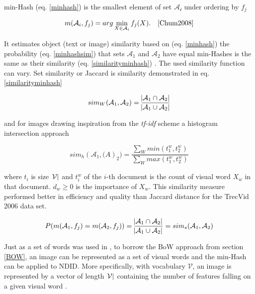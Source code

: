 \documentclass[english,12pt,a4paper,pdftex,elec,utf8, table]{aaltothesis}
\begin{document}
min-Hash (eq. \ref{minhash}) is the smallest element of set $\mathcal{A_i}$ under ordering by $f_j$

\begin{equation}\label{minhash}
m(\mathcal{A}_i,f_j)= arg \min_{X \in \mathcal{A}_i}f_j(X). \quad \cite{Chum2008}
\end{equation}

It estimates object (text or image) similarity based on (eq. \ref{minhash}) the probability (eq. \ref{minhashsim}) that sets $\mathcal{A}_1$ and $\mathcal{A}_2$ have equal min-Hashes is the same as their similarity (eq. \ref{similarityminhash}) \cite{Chum2008}. The used similarity function can vary. Set similarity or Jaccard is similarity demonstrated in eq. \ref{similarityminhash}

\begin{equation}\label{similarityminhash}
sim_W(\mathcal{A}_1,\mathcal{A}_2) = \frac{\abs{\mathcal{A}_1 \cap \mathcal{A}_2}}{\abs{\mathcal{A}_1 \cup \mathcal{A}_2}}
\end{equation}

 and for images drawing inspiration from the \emph{tf-idf} scheme a histogram intersection approach

\begin{equation}\label{similarityminhashimages}
sim_h(\mathcal{A}_1, \mathcal(A)_2)=\frac{\sum_W min(t^w_1,t^w_2)}{\sum_W max(t^w_1,t^w_2)}
\end{equation}

where $t_i$ is size $\abs{\mathcal{V}}$ and $t_i^w$ of the $i$-th document is the count of visual word $X_w$ in that document. $d_w \geq 0$ is the importance of $X_w$. This similarity measure performed better in efficiency and quality than Jaccard distance for the TrecVid 2006 data set. \cite{Chum2008}

\begin{equation}\label{minhashsim}
P(m(\mathcal{A}_1,f_j) = m(\mathcal{A}_2,f_j)) = \frac{\abs{\mathcal{A}_1 \cap \mathcal{A}_2}}{\abs{\mathcal{A}_1 \cup \mathcal{A}_2}} = sim_s(\mathcal{A}_1, \mathcal{A}_2)
\end{equation}

Just as a set of words was used in \cite{Broder1997}, to borrow the BoW approach from section \ref{BOW}, an image can be represented as a set of visual words and the min-Hash can be applied to NDID. More specifically, with vocabulary $\mathcal{V}$, an image is represented by a vector of length $\abs{\mathcal{V}}$ containing the number of features falling on a given visual word \cite{Chum2008}.
\end{document}

